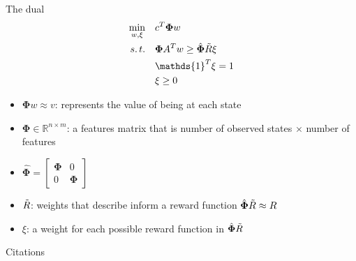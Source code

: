 \documentclass[9pt]{beamer}
\newcommand{\Real}{\mathbb{R}}
\newcommand{\PHI}{\bm{\Phi}}
\begin{document}
\begin{frame}{The dual}
\begin{equation}
\begin{aligned}
\min_{w, \xi}\quad & c^T \PHI w \\
s.\,t.\quad & \PHI A^T w \ge \hat{\PHI} \Tilde{R} \xi \\
& \mathds{1}^T \xi = 1 \\
& \xi \ge 0
\end{aligned}
\end{equation}

\centering
\begin{itemize}
    \item $\PHI w \approx v$: represents the value of being at each state
    \item $\PHI \in \Real^{n\times m}$: a features matrix that is number of observed states $\times$ number of features 
    \item $\hat{\PHI} = \begin{bmatrix}\PHI & 0 \\ 0 & \PHI \end{bmatrix}$
    \item $\Tilde{R}$: weights that describe inform a reward function $\hat{\PHI} \Tilde{R} \approx R$
    \item $\xi$: a weight for each possible reward function in $\hat{\PHI}\Tilde{R}$
\end{itemize}
\end{frame}








\begin{frame}{Citations}
 \printbibliography
   
\end{frame}
    
\end{document}
